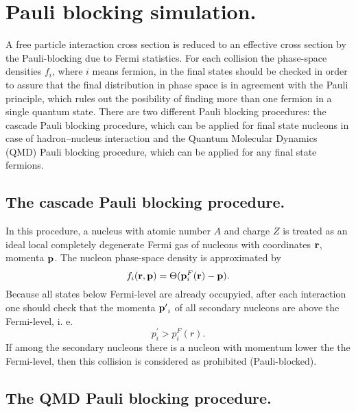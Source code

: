 \section{Pauli blocking simulation.}

\hspace{1.0em}A free particle interaction 
cross section is reduced to an effective cross section
by the Pauli-blocking due to Fermi statistics. For each 
collision the phase-space densities $f_i$, where $i$ means fermion, in
the final states should be checked in order to assure that the final
distribution in phase space is in agreement with the Pauli principle,
which rules out the posibility of finding more than one fermion in a
single quantum state. There are two different Pauli blocking procedures: 
the cascade Pauli blocking procedure, which can be applied for final state 
nucleons in case of hadron--nucleus interaction and the Quantum Molecular 
Dynamics (QMD) Pauli blocking procedure, which can be applied for any 
final state fermions.

\subsection{The cascade Pauli blocking procedure.}

\hspace{1.0em}In this procedure, a  nucleus with atomic number $A$ and
charge $Z$ is treated as an ideal local completely degenerate Fermi gas
of nucleons with coordinates ${\bf r}$, momenta ${\bf p}$.  The nucleon
phase-space density is approximated by
\begin{equation}
\label{PBS1} f_{i}({\bf r}, {\bf p}) = \Theta 
({\bf p}_{i}^F({\bf r}) - {\bf p}).
\end{equation}
Because all states below Fermi-level are already occupyied, after each
interaction one should check that the momenta ${\bf p^{\prime}}_i$ of
all secondary nucleons are above the Fermi-level, i. e.
\begin{equation}
\label{PBS2} p^{\prime}_i > p_{i}^F(r).
\end{equation}
If among the secondary nucleons there is a nucleon with momentum lower
the the Fermi-level, then this collision is considered as prohibited
(Pauli-blocked).


\subsection{ The QMD Pauli blocking procedure.} 

